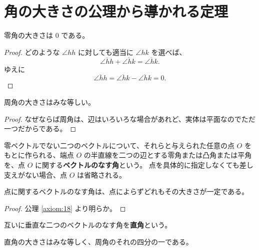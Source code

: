\chapter{角の大きさの公理から導かれる定理}

\begin{thm}\label{theorem:31}
  零角の大きさは \(0\) である。
\end{thm}

\begin{proof}
  どのような \(\angle{hh}\) に対しても適当に \(\angle{hk}\) を選べば、
  \[\overline{\angle{hh}}+\overline{\angle{hk}}=\overline{\angle{hk}}.\]
  ゆえに
  \[\overline{\angle{hh}}=\overline{\angle{hk}}-\overline{\angle{hk}}=0.\]
\end{proof}

\begin{thm}\label{theorem:32}
  周角の大きさはみな等しい。
\end{thm}

\begin{proof}
  なぜならば周角は、辺はいろいろな場合があれど、実体は平面なのでただ一つだからである。
\end{proof}

\begin{dfn}[ベクトルのなす角]\label{definition:26}
  零ベクトルでない二つのベクトルについて、それらと与えられた任意の点 \(O\) をもとに作られる、端点 \(O\) の半直線を二つの辺とする零角または凸角または平角を、点 \(O\) に関する\textbf{ベクトルのなす角}という。
  点を具体的に指定しなくても差し支えがない場合、点 \(O\) は省略される。
\end{dfn}

\begin{thm}\label{theorem:33}
  点に関するベクトルのなす角は、点によらずどれもその大きさが一定である。
\end{thm}

\begin{proof}
  公理 \ref{axiom:18} より明らか。
\end{proof}

\begin{dfn}[直角]\label{definition:27}
  互いに垂直な二つのベクトルのなす角を\textbf{直角}という。
\end{dfn}

\begin{thm}\label{theorem:34}
  直角の大きさはみな等しく、周角のそれの四分の一である。
\end{thm}

